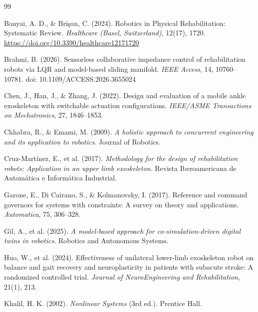 \documentclass[a4paper,12pt]{article}
\begin{document}
\newpage
\begin{thebibliography}{99}

    Banyai, A. D., \& Bri\c{s}an, C. (2024).
    \newblock Robotics in Physical Rehabilitation: Systematic Review.
    \newblock \emph{Healthcare (Basel, Switzerland)}, 12(17), 1720.
    \newblock \url{https://doi.org/10.3390/healthcare12171720}

    Brahmi, B. (2026).
    \newblock Sensorless collaborative impedance control of rehabilitation robots via LQR and model-based sliding manifold.
    \newblock \emph{IEEE Access}, 14, 10760--10781.
    \newblock doi: 10.1109/ACCESS.2026.3655024

    Chen, J., Han, J., \& Zhang, J. (2022).
    \newblock Design and evaluation of a mobile ankle exoskeleton with switchable actuation configurations.
    \newblock \emph{IEEE/ASME Transactions on Mechatronics}, 27, 1846--1853.

    Chhabra, R., \& Emami, M. (2009). \textit{A holistic approach to concurrent engineering and its application to robotics}. Journal of Robotics.

    Cruz-Martínez, E., et al. (2017). \textit{Methodology for the design of rehabilitation robots: Application in an upper limb exoskeleton}. Revista Iberoamericana de Automática e Informática Industrial.

    Garone, E., Di Cairano, S., \& Kolmanovsky, I. (2017). Reference and command governors for systems with constraints: A survey on theory and applications. \textit{Automatica}, 75, 306--328.

    Gil, A., et al. (2025). \textit{A model-based approach for co-simulation-driven digital twins in robotics}. Robotics and Autonomous Systems.

    Huo, W., et al. (2024).
    \newblock Effectiveness of unilateral lower-limb exoskeleton robot on balance and gait recovery and neuroplasticity in patients with subacute stroke: A randomized controlled trial.
    \newblock \emph{Journal of NeuroEngineering and Rehabilitation}, 21(1), 213.

    Khalil, H. K. (2002). \textit{Nonlinear Systems} (3rd ed.). Prentice Hall.


\end{thebibliography}
\end{document}
